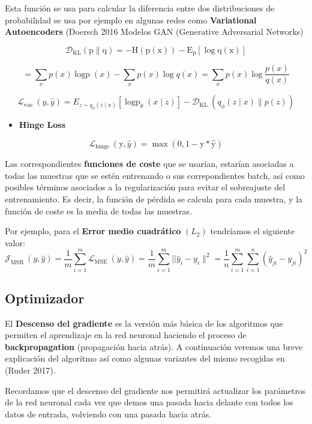 \documentclass[
  a4paper,
  DIV=11,
  numbers=noendperiod]{scrreprt}
\providecommand{\tightlist}{%
  \setlength{\itemsep}{0pt}\setlength{\parskip}{0pt}}\usepackage{longtable,booktabs,array}
\begin{document}
Esta función se usa para calcular la diferencia entre dos distribuciones
de probabilidad se usa por ejemplo en algunas redes como
\textbf{Variational Autoencoders} (Doersch 2016 Modelos GAN (Generative
Adversarial Networks)

\[
\mathcal{D}_{\mathrm{KL}}(\mathrm{p} \| \mathrm{q})=-\mathrm{H}(\mathrm{p}(\mathrm{x}))-\mathrm{E}_{\mathrm{p}}[\log \mathrm{q}(\mathrm{x})]
\]

\[
=\sum_x p(x) \operatorname{logp}(x)-\sum_x p(x) \log q(x)=\sum_x p(x) \log \frac{p(x)}{q(x)}
\]

\[
\mathcal{L}_{\text {vae }}(y, \hat{y})=E_{z \sim q_\phi(z \mid x)}\left[\operatorname{logp}_\theta(x \mid z)\right]-\mathcal{D}_{\text {KL }}\left(q_\phi(z \mid x) \| p(z)\right)
\]

\begin{itemize}
\tightlist
\item
  \textbf{Hinge Loss}
\end{itemize}

\[
\mathcal{L}_{\text {hinge }}(\mathrm{y}, \hat{y})=\max (0,1-\mathrm{y} * \hat{\mathrm{y}})
\]

Las correspondientes \textbf{funciones de coste} que se usarían,
estarían asociadas a todas las muestras que se estén entrenando o sus
correpondientes batch, así como posibles términos asociados a la
regularización para evitar el sobreajuste del entrenamiento. Es decir,
la función de pérdida se calcula para cada muestra, y la función de
coste es la media de todas las muestras.

Por ejemplo, para el \textbf{Error medio cuadrático}
\(\left(L_2\right)\) tendríamos el siguiente valor: \[
\mathcal{J}_{\text {MSB }}(y, \hat{y})=\frac{1}{m} \sum_{i=1}^m \mathcal{L}_{\text {MSE }}(y, \hat{y})=\frac{1}{m} \sum_{i=1}^m|| \hat{y}_i-y_i \|^2=\frac{1}{n} \sum_{i=1}^m \sum_{i=1}^n\left(\hat{y}_{j i}-y_{j i}\right)^2
\]

\subsection{Optimizador}\label{optimizador}

El \textbf{Descenso del gradiente} es la versión más básica de los
algoritmos que permiten el aprendizaje en la red neuronal haciendo el
proceso de \textbf{backpropagation} (propagación hacia atrás). A
continuación veremos una breve explicación del algoritmo así como
algunas variantes del mismo recogidas en (Ruder 2017).

Recordamos que el descenso del gradiente nos permitirá actualizar los
parámetros de la red neuronal cada vez que demos una pasada hacia
delante con todos los datos de entrada, volviendo con una pasada hacia
atrás.
\end{document}
